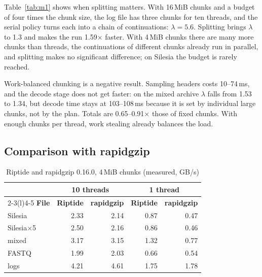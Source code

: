 \documentclass[conference]{IEEEtran}
\begin{document}
Table~\ref{tab:m1} shows when splitting matters. With 16\,MiB chunks and a budget of
four times the chunk size, the log file has three chunks for ten threads, and the
serial policy turns each into a chain of continuations: $\lambda = 5.6$. Splitting
brings $\lambda$ to 1.3 and makes the run 1.59$\times$ faster. With 4\,MiB chunks
there are many more chunks than threads, the continuations of different chunks
already run in parallel, and splitting makes no significant difference; on Silesia
the budget is rarely reached.

Work-balanced chunking is a negative result. Sampling headers costs 10--74\,ms, and
the decode stage does not get faster: on the mixed archive $\lambda$ falls from 1.53
to 1.34, but decode time stays at 103--108\,ms because it is set by individual large
chunks, not by the plan. Totals are 0.65--0.91$\times$ those of fixed chunks. With
enough chunks per thread, work stealing already balances the load.

\subsection{Comparison with rapidgzip}
\label{sec:rapidgzip}

\begin{table}[t]
\caption{Riptide and rapidgzip 0.16.0, 4\,MiB chunks (measured, GB/s)}
\label{tab:rapidgzip}
\centering
\footnotesize
\setlength{\tabcolsep}{3.5pt}
\begin{tabular}{@{}lrrrr@{}}
\toprule
 & \multicolumn{2}{c}{\textbf{10 threads}} & \multicolumn{2}{c}{\textbf{1 thread}} \\
\cmidrule(lr){2-3}\cmidrule(l){4-5}
\textbf{File} & \textbf{Riptide} & \textbf{rapidgzip} & \textbf{Riptide} & \textbf{rapidgzip} \\
\midrule
Silesia & 2.33 & 2.14 & 0.87 & 0.47 \\
Silesia$\times$5 & 2.50 & 2.16 & 0.86 & 0.46 \\
mixed & 3.17 & 3.15 & 1.32 & 0.77 \\
FASTQ & 1.99 & 2.03 & 0.66 & 0.54 \\
logs & 4.21 & 4.61 & 1.75 & 1.78 \\
\bottomrule
\end{tabular}
\end{table}
\end{document}
